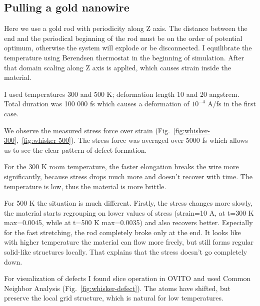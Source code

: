 \documentclass[12pt,a4paper]{article}
\begin{document}
\clearpage %

\subsection*{Pulling a gold nanowire}

Here we use a gold rod with periodicity along Z axis. The distance between the end and the periodical beginning of the rod must be on the order of potential optimum, otherwise the system will explode or be disconnected. I equilibrate the temperature using Berendsen thermostat in the beginning of simulation. After that domain scaling along Z axis is applied, which causes strain inside the material.

I used temperatures 300 and 500 K; deformation length 10 and 20 angstrem. Total duration was 100 000 fs which causes a deformation of $10^{-4}$ A/fs in the first case.

We observe the measured stress force over strain (Fig.~\ref{fig:whisker-300},~\ref{fig:whisker-500}). The stress force was averaged over 5000 fs which allows us to see the clear pattern of defect formation.

For the 300 K room temperature, the faster elongation breaks the wire more significantly, because stress drops much more and doesn't recover with time. The temperature is low, thus the material is more brittle.

For 500 K the situation is much different. Firstly, the stress changes more slowly, the material starts regrouping on lower values of stress (strain=10 A, at t=300 K max=0.0045, while at t=500 K max=0.0035) and also recovers better. Especially for the fast stretching, the rod completely broke only at the end. It looks like with higher temperature the material can flow more freely, but still forms regular solid-like structures locally. That explains that the stress doesn't go completely down.

For visualization of defects I found slice operation in OVITO and used Common Neighbor Analysis (Fig.~\ref{fig:whisker-defect}). The atoms have shifted, but preserve the local grid structure, which is natural for low temperatures.
\end{document}
